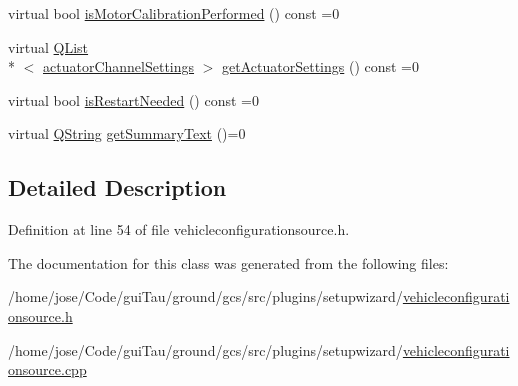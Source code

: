 \begin{DoxyCompactItemize}
\item 
virtual bool \hyperlink{group___vehicle_configuration_source_gaf2d0f922c260a7bd4481d565f1b46589}{is\-Motor\-Calibration\-Performed} () const =0
\item 
virtual \hyperlink{class_q_list}{Q\-List}\\*
$<$ \hyperlink{structactuator_channel_settings}{actuator\-Channel\-Settings} $>$ \hyperlink{group___vehicle_configuration_source_ga21ab7c07bd3271df54d776b80b974a0f}{get\-Actuator\-Settings} () const =0
\item 
virtual bool \hyperlink{group___vehicle_configuration_source_ga53deeed450e4e532d976fde372be6a54}{is\-Restart\-Needed} () const =0
\item 
virtual \hyperlink{group___u_a_v_objects_plugin_gab9d252f49c333c94a72f97ce3105a32d}{Q\-String} \hyperlink{group___vehicle_configuration_source_ga1f54adbaeda45aac3778c52569dfa2f9}{get\-Summary\-Text} ()=0
\end{DoxyCompactItemize}


\subsection{Detailed Description}


Definition at line 54 of file vehicleconfigurationsource.\-h.



The documentation for this class was generated from the following files\-:\begin{DoxyCompactItemize}
\item 
/home/jose/\-Code/gui\-Tau/ground/gcs/src/plugins/setupwizard/\hyperlink{vehicleconfigurationsource_8h}{vehicleconfigurationsource.\-h}\item 
/home/jose/\-Code/gui\-Tau/ground/gcs/src/plugins/setupwizard/\hyperlink{vehicleconfigurationsource_8cpp}{vehicleconfigurationsource.\-cpp}\end{DoxyCompactItemize}
